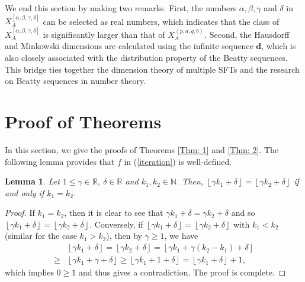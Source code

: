 \documentclass{amsart}
\newtheorem{lemma}[theorem]{Lemma}
\theoremstyle{definition}
\numberwithin{equation}{section}%
\begin{document}
We end this section by making two remarks. First, the numbers $\alpha ,\beta,\gamma $ and $\delta $ in $X_{A}^{\left[ \alpha ,\beta ,\gamma ,\delta\right] }$ can be selected as real numbers, which indicates that the class of $X_{A}^{\left[ \alpha ,\beta ,\gamma ,\delta \right] }$ is significantly larger than that of $X_{A}^{\left\langle p,a,q,b\right\rangle }$. Second, the Hausdorff and Minkowski dimensions are calculated using the infinite sequence $\mathbf{d}$, which is also closely associated with the distribution property of the Beatty sequences. This bridge ties together the dimension theory of multiple SFTs and the research on Beatty sequences in number theory. 

\section{Proof of Theorems}
In this section, we give the proofs of Theorems \ref{Thm: 1} and \ref{Thm: 2}. The following lemma provides that $f$ in (\ref{iteration}) is well-defined.
\begin{lemma}\label{lma1}
    Let $1\leq\gamma\in\mathbb{R}$, $\delta\in\mathbb{R}$ and $k_1,k_2\in\mathbb{N}$. Then, $\left\lfloor \gamma k_1+\delta\right\rfloor= \left\lfloor \gamma k_2+\delta\right\rfloor$ if and only if $k_1= k_2$. 
\end{lemma}

\begin{proof}
    If $k_1=k_2$, then it is clear to see that $ \gamma k_1+\delta= \gamma k_2+\delta$ and so $\left\lfloor \gamma k_1+\delta\right\rfloor= \left\lfloor \gamma k_2+\delta\right\rfloor$. Conversely, if $\left\lfloor \gamma k_1+\delta\right\rfloor= \left\lfloor \gamma k_2+\delta\right\rfloor$ with $k_1< k_2$ (similar for the case $k_1>k_2$), then by $\gamma\geq 1$, we have
    \begin{align*}
        &\left\lfloor \gamma k_1+\delta\right\rfloor= \left\lfloor \gamma k_2+\delta\right\rfloor=\left\lfloor \gamma k_1+\gamma(k_2-k_1)+\delta\right\rfloor\\
        \geq&  \left\lfloor \gamma k_1+\gamma+\delta\right\rfloor\geq\left\lfloor \gamma k_1+1+\delta\right\rfloor=\left\lfloor \gamma k_1+\delta\right\rfloor+1,
    \end{align*}
    which implies $0\geq 1$ and thus gives a contradiction. The proof is complete.
\end{proof}
\end{document}
